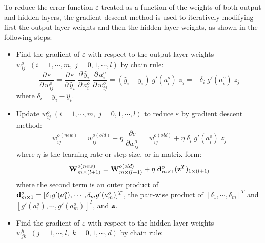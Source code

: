 \documentclass{article}
\begin{document}
\begin{itemize}
  To reduce the error function $\varepsilon$ treated as a function of 
  the weights of both output and hidden layers, the gradient descent 
  method is used to iteratively modifying first the output layer weights 
  and then the hidden layer weights, as shown in the following steps:
  \begin{itemize}

  \item Find the gradient of $\varepsilon$ with respect to the output
    layer weights $w_{ij}^{o}\;\;(i=1,\cdots,m,\;j=0,1,\cdots,l)$ by 
    chain rule:
    \begin{equation}
      \frac{\partial\,\varepsilon}{\partial\, w_{ij}^o}
      =\frac{\partial\,\varepsilon}{\partial\, \hat{y}_i}\;
      \frac{\partial\, \hat{y}_i}{\partial\, a^o_i}\;
      \frac{\partial\, a^o_i}{\partial\, w_{ij}^{o}}
      =(\hat{y}_i-y_i)\;g'(a^o_i)\;z_j=-\delta_i\;g'(a^o_i)\;z_j
    \end{equation}
    where $\delta_i=y_i-\hat{y}_i$.

  \item Update $w_{ij}^{o}\;(i=1,\cdots,m,\;j=0,1,\cdots,l)$ to reduce 
    $\varepsilon$ by gradient descent method:
    \begin{equation}
      w_{ij}^{o(new)}=w_{ij}^{o(old)}-\eta\;\frac{\partial e}{\partial w_{ij}^o}
      =w_{ij}^{o(old)} +\eta\;\delta_i\;g'(a^o_i)\;z_j    
    \end{equation}
    where $\eta$ is the learning rate or step size, or in matrix form:
    \begin{equation}
      {\bf W}^{o(new)}_{m\times (l+1)}
      ={\bf W}^{o(old)}_{m\times (l+1)}+\eta\;{\bf d}^o_{m\times 1}({\bf z}^T)_{1\times (l+1)}
    \end{equation}
    where the second term is an outer product of 
    ${\bf d}^o_{m\times 1}=[\delta_1 g'(a^o_1),\cdots,\delta_m g'(a^o_m)]^T$,
    the pair-wise product of $[\delta_1,\cdots,\delta_m]^T$ and
    $[g'(a_1^o),\cdots,g'(a_m^o)]^T$, and ${\bf z}$.

  \item Find the gradient of $\varepsilon$ with respect to the hidden
    layer weights $w_{jk}^h\;\;(j=1,\cdots,l,\;k=0,1,\cdots,d)$ by
    chain rule:


\end{itemize}
\end{itemize}
\end{document}
